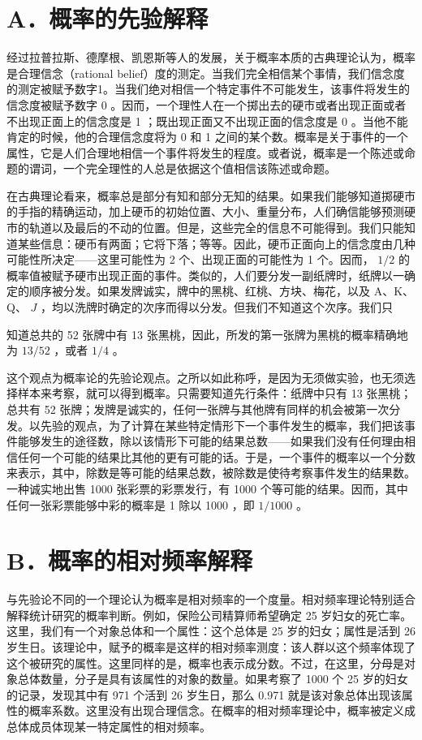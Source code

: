 \section*{A．概率的先验解释}
经过拉普拉斯、德摩根、凯恩斯等人的发展，关于概率本质的古典理论认为，概率是合理信念（rational belief）度的测定。当我们完全相信某个事情，我们信念度的测定被赋予数字1。当我们绝对相信一个特定事件不可能发生，该事件将发生的信念度被赋予数字 0 。因而，一个理性人在一个掷出去的硬市或者出现正面或者不出现正面上的信念度是 1 ；既出现正面又不出现正面的信念度是 0 。当他不能肯定的时候，他的合理信念度将为 0 和 1 之间的某个数。概率是关于事件的一个属性，它是人们合理地相信一个事件将发生的程度。或者说，概率是一个陈述或命题的谓词，一个完全理性的人总是依据这个值相信该陈述或命题。

在古典理论看来，概率总是部分有知和部分无知的结果。如果我们能够知道掷硬市的手指的精确运动，加上硬币的初始位置、大小、重量分布，人们确信能够预测硬市的轨道以及最后的不动的位置。但是，这些完全的信息不可能得到。我们只能知道某些信息：硬币有两面；它将下落；等等。因此，硬币正面向上的信念度由几种可能性所决定——这里可能性为 2 个、出现正面的可能性为 1 个。因而， $1 / 2$ 的概率值被赋予硬市出现正面的事件。类似的，人们要分发一副纸牌时，纸牌以一确定的顺序被分发。如果发牌诚实，牌中的黑桃、红桃、方块、梅花，以及 A、K、Q、 $J$ ，均以洗牌时确定的次序而得以分发。但我们不知道这个次序。我们只

知道总共的 52 张牌中有 13 张黑桃，因此，所发的第一张牌为黑桃的概率精确地为 $13 / 52$ ，或者 $1 / 4$ 。

这个观点为概率论的先验论观点。之所以如此称呼，是因为无须做实验，也无须选择样本来考察，就可以得到概率。只需要知道先行条件：纸牌中只有 13 张黑桃；总共有 52 张牌；发牌是诚实的，任何一张牌与其他牌有同样的机会被第一次分发。以先验的观点，为了计算在某些特定情形下一个事件发生的概率，我们把该事件能够发生的途径数，除以该情形下可能的结果总数——如果我们没有任何理由相信任何一个可能的结果比其他的更有可能的话。于是，一个事件的概率以一个分数来表示，其中，除数是等可能的结果总数，被除数是使待考察事件发生的结果数。一种诚实地出售 1000 张彩票的彩票发行，有 1000 个等可能的结果。因而，其中任何一张彩票能够中彩的概率是 1 除以 1000 ，即 $1 / 1000$ 。

\section*{B．概率的相对频率解释}
与先验论不同的一个理论认为概率是相对频率的一个度量。相对频率理论特别适合解释统计研究的概率判断。例如，保险公司精算师希望确定 25 岁妇女的死亡率。这里，我们有一个对象总体和一个属性：这个总体是 25 岁的妇女；属性是活到 26 岁生日。该理论中，赋予的概率是这样的相对频率测度：该人群以这个频率体现了这个被研究的属性。这里同样的是，概率也表示成分数。不过，在这里，分母是对象总体数量，分子是具有该属性的对象的数量。如果考察了 1000 个 25 岁的妇女的记录，发现其中有 971 个活到 26 岁生日，那么 0.971 就是该对象总体出现该属性的概率系数。这里没有出现合理信念。在概率的相对频率理论中，概率被定义成总体成员体现某一特定属性的相对频率。

